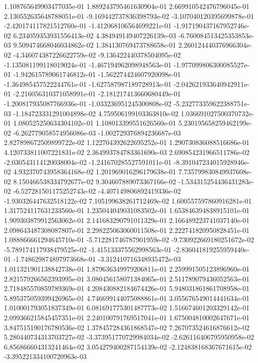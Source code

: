 1.108765649903477035e-01
1.889243795461630904e-01
2.669910542476796045e-01
2.130552635648788051e-01
-9.169442737836398793e-02
-3.107040120395699878e-01
-2.420174117821512760e-01
-1.412068106564699221e-01
-1.917190437167952746e-02
6.234059353931556413e-02
4.384949149407226139e-03
-6.760084513425353853e-03
9.509474668046034862e-02
1.384130769473788658e-01
2.260124440376966304e-02
-4.346074387226622759e-02
-9.136422440378504095e-02
-1.135081199118019024e-01
-1.467194962098948563e-01
-1.977099806300085527e-01
-1.942615789061746812e-01
-1.562274424607920098e-01
-1.364985457522244761e-01
-1.627587987189728913e-01
-2.042621933640942911e-01
-2.216056310371058991e-01
-2.181217413660680449e-01
-1.200817935087766936e-01
-1.033236951245300808e-02
-5.232773359622388751e-03
-1.184723331291004898e-02
4.759506199103363810e-02
1.036691027500370732e-01
1.080525250634304102e-01
1.108013399551626560e-01
5.230195658259462199e-02
-6.262779058574956086e-03
-1.002729376894236687e-03
2.827898672509899722e-02
1.122704392622695252e-01
1.290730836088516686e-01
4.120733811007221831e-02
2.364993784783361690e-03
2.690854231966511786e-02
-2.030543114120038004e-02
-1.241670285527591011e-01
-8.391047234015928946e-02
4.932370743958364168e-02
1.201969016296179638e-01
7.735799830849937608e-02
8.150466538334792677e-02
9.304607889073367166e-02
-1.534315254436431283e-02
-6.527281501175252743e-02
-4.407149806892419336e-02
-1.930326447632518122e-02
7.105199638261712469e-02
1.600557597860916281e-01
1.317524117631233560e-01
1.235044049031083502e-01
1.653846394838915101e-01
1.909303879912563062e-01
2.141683290791011329e-01
2.166489223741037140e-01
2.098643487308087807e-01
2.298225063060011508e-01
2.222741820950828451e-01
1.088866661294645710e-01
-5.712281746787901959e-02
-9.730922669180251672e-02
-5.789174117938479525e-02
-1.415133375562998563e-01
-2.836041819255959440e-01
-1.748629874897973668e-01
-3.312410716348935472e-03
1.011321901138842738e-01
1.879636349979206811e-01
2.259991505123896960e-01
2.821579266562393995e-01
3.080456158071384065e-01
2.511789079436052563e-01
2.718485570859789369e-01
4.208430882184674426e-01
5.948031861861708958e-01
5.895375059399426965e-01
4.746699144075088861e-01
3.055676549014441634e-01
1.010001793051837349e-01
6.081691775301487773e-02
1.516674601203329142e-01
2.099366215845457351e-01
2.240100791769517041e-01
1.675004810002647671e-01
3.847515190176780536e-02
1.378457284361868547e-02
7.267073524616876612e-02
5.280440734313703727e-02
-3.373951770729984034e-02
-2.626116406795950958e-02
6.856866604313241464e-02
3.054279400287154139e-02
-2.124838168367671615e-02
-3.395221334100720963e-03
